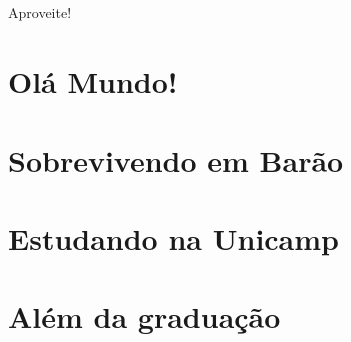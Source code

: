 \documentclass[a4paper,10pt]{book}
\begin{document}
\paragraph{}
Aproveite!

\tableofcontents

\mainmatter
\chapter{Olá Mundo!}


\clearpage


\clearpage


\clearpage

\twocolumn


\chapter{Sobrevivendo em Barão}

\newpage

\newpage

\newpage

\newpage


\chapter{Estudando na Unicamp}

\newpage

\newpage

\newpage

\newpage

\newpage

\newpage

\newpage

\newpage


\chapter{Além da graduação}

\newpage

\newpage

\newpage

\newpage

\newpage

\newpage

\newpage

\end{document}
